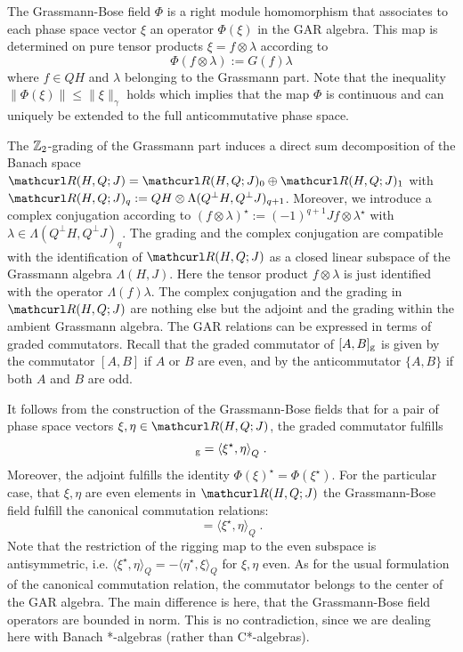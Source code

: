 \documentclass[pra,twoside,amsmath,amsfonts,amssymb,superscriptaddress,showpacs]{revtex4}
\def\7#1{{\Bbb #1}}
\def\9#1{{\mathcurl #1}}
\newcommand{\RIGG}[3]{{\langle}{#1},{#2}{\rangle}_{#3}}
\newcommand{\GR}[2]{\Lambda(#1,#2)}
\newcommand{\GCO}[2]{[#1,#2]_{\rm g}}
\newcommand{\CO}[2]{[#1,#2]}
\newcommand{\ACO}[2]{\{#1,#2\}}
\newcommand{\PHSP}[3]{\9R(#1,#3;#2)}
\newcommand{\ADJ}{\star}
\newcommand{\PCN}[1]{\|#1\|_\gamma}
\begin{document}
The Grassmann-Bose field $\Phi$ is a right module homomorphism that associates to each
phase space vector $\xi$ an operator $\Phi(\xi)$ in the GAR algebra. This map is determined on pure
tensor products $\xi=f\otimes\lambda$ according to 
\begin{equation}
\Phi(f\otimes\lambda):=G(f)\lambda
\end{equation}
where $f\in QH$ and $\lambda$ belonging to the Grassmann part. Note that the inequality
$\|\Phi(\xi)\|\leq \PCN{\xi}$ holds which implies that the map $\Phi$ is continuous and can uniquely
be extended to the full anticommutative phase space. 

The $\7Z_2$-grading of the Grassmann part induces a direct sum decomposition of the
Banach space $\PHSP{H}{J}{Q}=\PHSP{H}{J}{Q}_0\oplus\PHSP{H}{J}{Q}_1$ with
$\PHSP{H}{J}{Q}_q:=QH\otimes\GR{Q^\perp H}{Q^\perp J}_{q+1}$. Moreover, we introduce a complex
conjugation according to $(f\otimes\lambda)^\ADJ:=(-1)^{q+1} Jf\otimes\lambda^\ADJ$ with
$\lambda\in\GR{Q^\perp H}{Q^\perp J}_q$. The grading and the complex conjugation are compatible
with the identification of $\PHSP{H}{J}{Q}$ as a closed linear subspace of the Grassmann algebra
$\GR{H}{J}$. Here the tensor product $f\otimes\lambda$ is just identified with the operator
$\Lambda(f)\lambda$. The complex conjugation and the grading in $\PHSP{H}{J}{Q}$ are nothing else
but the adjoint and the grading within the ambient Grassmann algebra. The GAR relations can be
expressed in terms of graded commutators. Recall that the graded commutator of $\GCO{A}{B}$ is
given by the commutator $\CO{A}{B}$ if $A$ or $B$ are even, and by the anticommutator $\ACO{A}{B}$
if both $A$ and $B$ are odd. 

It follows from the construction of the Grassmann-Bose fields that for a pair of phase space vectors
$\xi,\eta\in\PHSP{H}{J}{Q}$, the graded commutator fulfills
\begin{equation}
\GCO{\Phi(\xi)}{\Phi(\eta)}=\RIGG{\xi^\ADJ}{\eta}{Q}  \; .
\end{equation}
Moreover, the adjoint fulfills the identity $\Phi(\xi)^\ADJ=\Phi(\xi^\ADJ)$. For the
particular case, that $\xi,\eta$ are even elements in $\PHSP{H}{J}{Q}$ the Grassmann-Bose
field fulfill the canonical commutation relations:
\begin{equation}
\CO{\Phi(\xi)}{\Phi(\eta)}=\RIGG{\xi^\ADJ}{\eta}{Q} \; .
\end{equation}
Note that the restriction of the rigging map to the even subspace is antisymmetric, i.e.
$\RIGG{\xi^\ADJ}{\eta}{Q}=-\RIGG{\eta^\ADJ}{\xi}{Q}$ for
$\xi,\eta$ even. As for the usual formulation of the canonical commutation relation, the commutator
belongs to the center of the GAR algebra. The main difference is here, that the Grassmann-Bose
field operators are bounded in norm. This is no contradiction, since we are dealing here with
Banach *-algebras (rather than C*-algebras).
\end{document}

